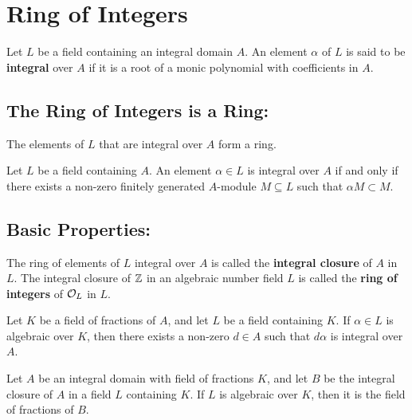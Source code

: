 \documentclass[12pt]{amsart}
\begin{document}



\section{Ring of Integers}

\begin{definition}
    Let $L$ be a field containing an integral domain $A$. An element $\alpha$ of $L$ is said to be \textbf{integral} over $A$ if it is a root of a monic polynomial with coefficients in $A$.
\end{definition}
\bbni

\subsection{The Ring of Integers is a Ring:}

\begin{theorem}
    The elements of $L$ that are integral over $A$ form a ring.
\end{theorem}


\begin{theorem}
    Let $L$ be a field containing $A$. An element $\alpha \in L$ is integral over $A$ if and only if there exists a non-zero finitely generated $A$-module $M \subseteq L$ such that $\alpha M \subset M$. 
\end{theorem}




\bbni

\subsection{Basic Properties:}
\begin{definition}
    The ring of elements of $L$ integral over $A$ is called the \textbf{integral closure} of $A$ in $L$. The integral closure of $\mathbb Z$ in an algebraic number field $L$ is called the \textbf{ring of integers} of $\mathcal{O}_L$ in $L$. 
\end{definition}

\begin{proposition}
    Let $K$ be a field of fractions of $A$, and let $L$ be a field containing $K$. If $\alpha \in L$ is algebraic over $K$, then there exists a non-zero $d \in A$ such that $d\alpha$ is integral over $A$.
\end{proposition}


\begin{corollary}
    Let $A$ be an integral domain with field of fractions $K$, and let $B$ be the integral closure of $A$ in a field $L$ containing $K$. If $L$ is algebraic over $K$, then it is the field of fractions of $B$.  
\end{corollary}
\end{document}
